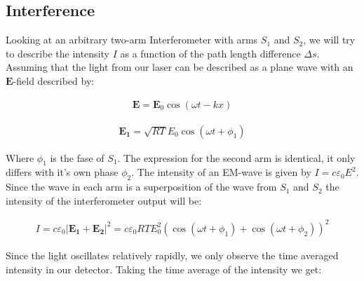 \subsection{Interference}
Looking at an arbitrary two-arm Interferometer with arms $S_1$ and $S_2$, we will try to describe the intensity $I$ as a function of the path length difference $\Delta s$. Assuming that the light from our laser can be described as a plane wave with an  $\textbf{E}$-field described by:

\begin{align}
\mathbf{E}=\mathbf{E}_0\cos(\omega t-kx)
\label{efelt}
\end{align}


\begin{align}
	\mathbf{E_1}=\sqrt{RT}E_0\cos(\omega t+\phi_1)
	\label{Earm}
\end{align}

Where $\phi_1$ is the fase of $S_1$. The expression for the second arm is identical, it only differs with it's own phase $\phi_2$. The intensity of an EM-wave is given by $I=c\varepsilon_0 E^2$. Since the wave in each arm is a superposition of the wave from $S_1$ and $S_2$ the intensity of the interferometer output will be:

\begin{align}
I = c\varepsilon_0 |\mathbf{E_1}+\mathbf{E_2}|^2=c\varepsilon_0 RTE_{0}^2 (\cos(\omega t +\phi_1)+\cos(\omega t+\phi_2))^2
\label{intensity1}
\end{align}

Since the light oscillates relatively rapidly, we only observe the time averaged intensity in our detector. Taking the time average of the intensity we get:

